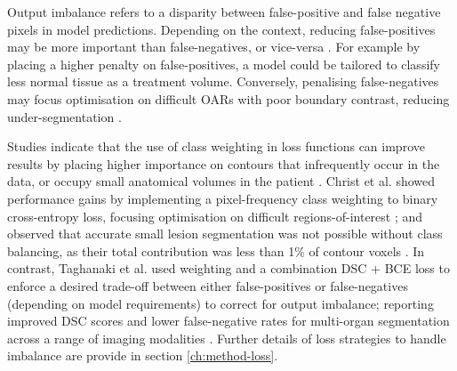 Output imbalance refers to a disparity between false-positive and false negative pixels in model predictions. Depending on the context, reducing false-positives may be more important than false-negatives, or vice-versa \cite{taghanaki2018}. For example by placing a higher penalty on false-positives, a model could be tailored to classify less normal tissue as a treatment volume. Conversely, penalising false-negatives may focus optimisation on difficult OARs with poor boundary contrast, reducing under-segmentation \cite{taghanaki2018}.

Studies indicate that the use of class weighting in loss functions can improve results by placing higher importance on contours that infrequently occur in the data, or occupy small anatomical volumes in the patient \cite{taghanaki2018}. Christ et al. showed performance gains by implementing a pixel-frequency class weighting to binary cross-entropy loss, focusing optimisation on difficult regions-of-interest \cite{ferdin2017}; and observed that accurate small lesion segmentation was not possible without class balancing, as their total contribution was less than 1\% of contour voxels \cite{ferdin2017}. In contrast, Taghanaki et al. used weighting and a combination DSC + BCE loss to enforce a desired trade-off between either false-positives or false-negatives (depending on model requirements) to correct for output imbalance; reporting improved DSC scores and lower false-negative rates for multi-organ segmentation across a range of imaging modalities \cite{taghanaki2018}. Further details of loss strategies to handle imbalance are provide in section \ref{ch:method-loss}.

